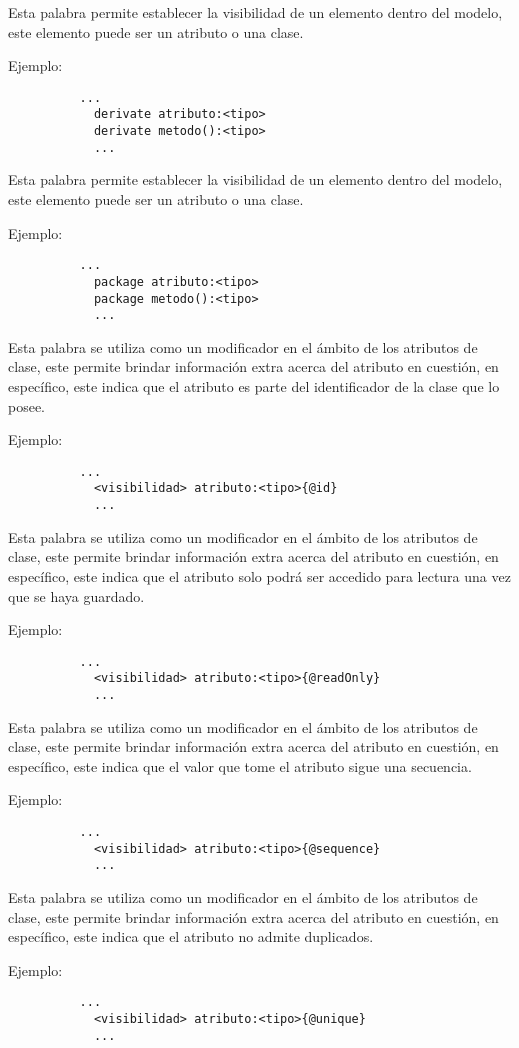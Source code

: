 \begin{description}[align=right,labelwidth=2.5cm]
\item[derivate] Esta palabra permite establecer la visibilidad de un elemento
	dentro del modelo, este elemento puede ser un atributo o una clase.

	Ejemplo:
		\begin{lstlisting}
		  ...
			derivate atributo:<tipo>
			derivate metodo():<tipo>
			...
		\end{lstlisting}

\item [package] Esta palabra permite establecer la visibilidad de un elemento
	dentro del modelo, este elemento puede ser un atributo o una clase.

	Ejemplo:
		\begin{lstlisting}
		  ...
			package atributo:<tipo>
			package metodo():<tipo>
			...
		\end{lstlisting}

\item [@id] Esta palabra se utiliza como un modificador en el ámbito de
	los atributos de clase, este permite brindar información extra acerca del
	atributo en cuestión, en específico, este indica que el atributo es parte del
	identificador de la clase que lo posee.

	Ejemplo:
		\begin{lstlisting}
		  ...
			<visibilidad> atributo:<tipo>{@id}
			...
		\end{lstlisting}

\item [@readOnly] Esta palabra se utiliza como un modificador en el ámbito de
	los atributos de clase, este permite brindar información extra acerca del
	atributo en cuestión, en específico, este indica que el atributo solo podrá
	ser accedido para lectura una vez que se haya guardado.

	Ejemplo:
		\begin{lstlisting}
		  ...
			<visibilidad> atributo:<tipo>{@readOnly}
			...
		\end{lstlisting}

\item [@sequence] Esta palabra se utiliza como un modificador en el ámbito de
	los atributos de clase, este permite brindar información extra acerca del
	atributo en cuestión, en específico, este indica que el valor que tome el
	atributo sigue una secuencia.

	Ejemplo:
		\begin{lstlisting}
		  ...
			<visibilidad> atributo:<tipo>{@sequence}
			...
		\end{lstlisting}

\item [@unique] Esta palabra se utiliza como un modificador en el ámbito de
	los atributos de clase, este permite brindar información extra acerca del
	atributo en cuestión, en específico, este indica que el atributo no admite
	duplicados.

	Ejemplo:
		\begin{lstlisting}
		  ...
			<visibilidad> atributo:<tipo>{@unique}
			...
		\end{lstlisting}

\end{description}
